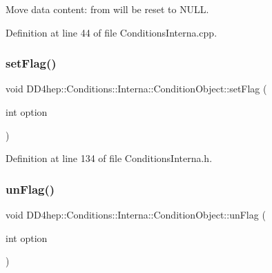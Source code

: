 Move data content\+: \textquotesingle{}from\textquotesingle{} will be reset to N\+U\+LL. 



Definition at line 44 of file Conditions\+Interna.\+cpp.

\hypertarget{class_d_d4hep_1_1_conditions_1_1_interna_1_1_condition_object_ae060ad7c29aae54e9c6701db35408155}{}\label{class_d_d4hep_1_1_conditions_1_1_interna_1_1_condition_object_ae060ad7c29aae54e9c6701db35408155} 
\subsubsection{\texorpdfstring{set\+Flag()}{setFlag()}}
{\footnotesize\ttfamily void D\+D4hep\+::\+Conditions\+::\+Interna\+::\+Condition\+Object\+::set\+Flag (\begin{DoxyParamCaption}\item[{int}]{option }\end{DoxyParamCaption})\hspace{0.3cm}{\ttfamily [inline]}}



Definition at line 134 of file Conditions\+Interna.\+h.

\hypertarget{class_d_d4hep_1_1_conditions_1_1_interna_1_1_condition_object_ad0e2c621be69101fa71fd96aaff0c15d}{}\label{class_d_d4hep_1_1_conditions_1_1_interna_1_1_condition_object_ad0e2c621be69101fa71fd96aaff0c15d} 
\subsubsection{\texorpdfstring{un\+Flag()}{unFlag()}}
{\footnotesize\ttfamily void D\+D4hep\+::\+Conditions\+::\+Interna\+::\+Condition\+Object\+::un\+Flag (\begin{DoxyParamCaption}\item[{int}]{option }\end{DoxyParamCaption})\hspace{0.3cm}{\ttfamily [inline]}}




